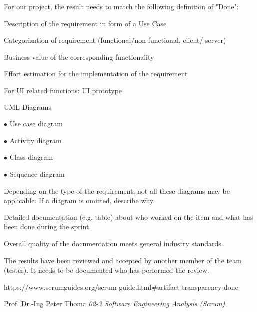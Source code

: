 \documentclass[a4paper, 12pt]{article}
\begin{document}
For our project, the result needs to match the following definition of "Done":
\begin{todolist}

\item Description of the requirement in form of a Use Case
\item Categorization of requirement (functional/non-functional, client/ server)
\item Business value of the corresponding functionality
\item Effort estimation for the implementation of the requirement
\item For UI related functions: UI prototype
\item UML Diagrams 

    $\bullet$ Use case diagram
    
    $\bullet$ Activity diagram
    
    $\bullet$ Class diagram
    
    $\bullet$ Sequence diagram
    
    Depending on the type of the requirement, not all these diagrams may be applicable. If a diagram is omitted, describe why.
\item Detailed documentation (e.g. table) about who worked on the item and what has been done during the sprint.
\item Overall quality of the documentation meets general industry standards.
\item The results have been reviewed and accepted by another member of the team (tester). It needs to be documented who has performed the review.

\end{todolist}



\newpage    

\begin{thebibliography}{}
https://www.scrumguides.org/scrum-guide.html\#artifact-transparency-done 

 Prof. Dr.-Ing Peter Thoma \emph{02-3 Software Engineering Analysis (Scrum)}

\end{thebibliography}

\end{document}
